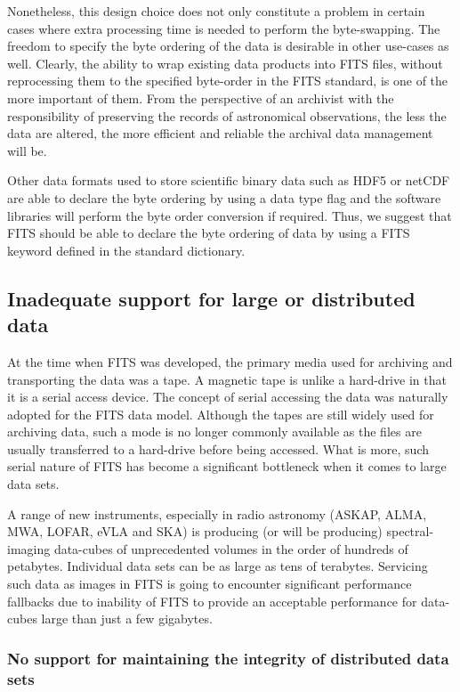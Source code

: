 \documentclass[final,authoryear,5p,times,twocolumn]{elsarticle}
\begin{document}
Nonetheless, this design choice does not only constitute a problem in
certain cases where extra processing time is needed to perform the
byte-swapping.  The freedom to specify the byte ordering of the data is
desirable in other use-cases as well. Clearly, the ability to wrap existing
data products into FITS files, without reprocessing them to the specified
byte-order in the FITS standard, is one of the more important of them. From
the perspective of an archivist with the responsibility of preserving the
records of astronomical observations, the less the data are altered, the
more efficient and reliable the archival data management will be.


Other data formats used to store scientific binary data such as HDF5 or
netCDF are able to declare the byte ordering by using a data type flag and
the software libraries will perform the byte order conversion if required.
Thus, we suggest that FITS should be able to declare the byte ordering of
data by using a FITS keyword defined in the standard dictionary.


\subsection{Inadequate support for large or distributed data}

At the time when FITS was developed, the primary media used for
archiving and transporting the data was a tape. A magnetic tape is
unlike a hard-drive in that it is a serial access device.  The concept
of serial accessing the data was naturally adopted for the FITS data
model.  Although the tapes are still widely used for archiving data,
such a mode is no longer commonly available as the files are usually
transferred to a hard-drive before being accessed. What is more, such
serial nature of FITS has become a significant bottleneck when it comes
to large data sets.

A range of new instruments, especially in radio astronomy (ASKAP,
ALMA, MWA, LOFAR, eVLA and SKA) is producing (or will be producing)
spectral-imaging data-cubes of unprecedented volumes in the order of
hundreds of petabytes. Individual data sets can be as large as tens of
terabytes.  Servicing such data as images in FITS is going to encounter
significant performance fallbacks due to inability of FITS to provide
an acceptable performance for data-cubes large than just a few gigabytes.

\subsubsection{No support for maintaining the integrity of distributed data sets}
\end{document}
